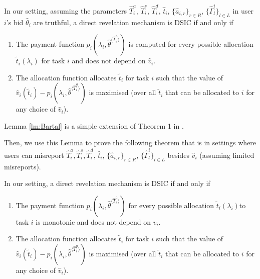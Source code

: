 \documentclass[11pt]{phdthesis}
\begin{document}
\begin{lemma}\label{lm:Bartal}
    In our setting, assuming the parameters $\hat{T}_i^a$, $\hat{T}_i^s$, $\hat{T}_i^d$, $ \hat{t}_i $, $ \{ \hat{a}_{i,r} \}_{r \in R} $, $ \{ \hat{\Gamma}_l^i \}_{l \in L} $ in user $ i $'s bid $ \hat{\theta}_i $ are truthful, a direct revelation mechanism is DSIC if and only if
    
    \begin{enumerate}
        \item The payment function $p_i(\lambda_i, \hat{\theta}^{\langle \hat{T}_i^a \rangle})
        $ is computed for every possible allocation $\tilde{t}_i(\lambda_i) $ for task $i$ and does not depend on $\hat{v}_i$.
        \item The allocation function allocates $\tilde{t}_i$ for task $i$ such that the value of $\hat{v}_i( \tilde{t}_i)-p_i(\lambda_i, \hat{\theta}^{\langle \hat{T}_i^a \rangle}) $ is maximised (over all $\tilde{t}_i$ that can be allocated to $i$ for any choice of $\hat{v}_i$).
    \end{enumerate}
\end{lemma}

Lemma \ref{lm:Bartal} is a simple extension of Theorem 1 in \citep{bartal2003incentive}. 

Then, we use this Lemma to prove the following theorem that is in settings where users can misreport $ \hat{T}_i^a,\hat{T}_i^s,\hat{T}_i^d $, $ \hat{t}_i $, $ \{ \hat{a}_{i,r} \}_{r \in R} $, $ \{ \hat{\Gamma}_l^i \}_{l \in L} $ besides $\hat{v}_i$ (assuming limited misreports).

\begin{theorem} \label{th: DSIC}
    In our setting, a direct revelation mechanism is DSIC if and only if
    \begin{enumerate}
      \item The payment function $p_i(\lambda_i, \hat{\theta}^{\langle \hat{T}_i^a \rangle}) $ for every possible allocation $ \tilde{t}_i(\lambda_i)$to task $i$ is monotonic and does not depend on $\hat{v}_i$.
        \item The allocation function allocates $ \tilde{t}_i  $ for task $i$ such that the value of $\hat{v}_i( \tilde{t}_i)-p_i(\lambda_i, \hat{\theta}^{\langle \hat{T}_i^a \rangle}) $ is maximised (over all $ \tilde{t}_i$ that can be allocated to $i$ for any choice of $\hat{v}_i$).
    \end{enumerate}
\end{theorem}
\end{document}
